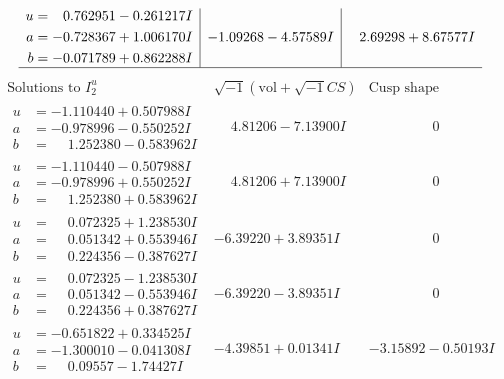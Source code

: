 \documentclass[1p]{elsarticle_modified}
\theoremstyle{definition}
\newcommand{\I}{\sqrt{-1}}
\begin{document}
$$\begin{array}{c|c|c}
\begin{aligned}
u &= \phantom{-}0.762951 - 0.261217 I \\
a &= -0.728367 + 1.006170 I \\
b &= -0.071789 + 0.862288 I\end{aligned}
 & -1.09268 - 4.57589 I & \phantom{-}2.69298 + 8.67577 I\\
 \hline 
 \end{array}$$\newpage$$\begin{array}{c|c|c}  
\text{Solutions to }I^u_{2}& \I (\text{vol} + \sqrt{-1}CS) & \text{Cusp shape}\\
 \hline 
\begin{aligned}
u &= -1.110440 + 0.507988 I \\
a &= -0.978996 - 0.550252 I \\
b &= \phantom{-}1.252380 - 0.583962 I\end{aligned}
 & \phantom{-}4.81206 - 7.13900 I & \phantom{-0.000000 } 0 \\ \hline\begin{aligned}
u &= -1.110440 - 0.507988 I \\
a &= -0.978996 + 0.550252 I \\
b &= \phantom{-}1.252380 + 0.583962 I\end{aligned}
 & \phantom{-}4.81206 + 7.13900 I & \phantom{-0.000000 } 0 \\ \hline\begin{aligned}
u &= \phantom{-}0.072325 + 1.238530 I \\
a &= \phantom{-}0.051342 + 0.553946 I \\
b &= \phantom{-}0.224356 - 0.387627 I\end{aligned}
 & -6.39220 + 3.89351 I & \phantom{-0.000000 } 0 \\ \hline\begin{aligned}
u &= \phantom{-}0.072325 - 1.238530 I \\
a &= \phantom{-}0.051342 - 0.553946 I \\
b &= \phantom{-}0.224356 + 0.387627 I\end{aligned}
 & -6.39220 - 3.89351 I & \phantom{-0.000000 } 0 \\ \hline\begin{aligned}
u &= -0.651822 + 0.334525 I \\
a &= -1.300010 - 0.041308 I \\
b &= \phantom{-}0.09557 - 1.74427 I\end{aligned}
 & -4.39851 + 0.01341 I & -3.15892 - 0.50193 I \\ \hline\begin{aligned}

\end{aligned}
\end{array}$$
\end{document}
